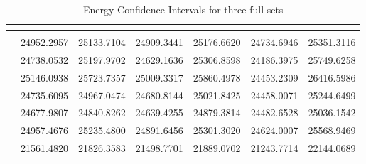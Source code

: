 \begin{table}[h!]
    \begin{center}
        \begin{tabular}{|c|r|r|r|r|r|r|}
            \hline
            &  &  &  \\
            \hline
             &  &  &  &  &  &  \\
            \hline
             & 24952.2957 & 25133.7104 & 24909.3441 & 25176.6620 & 24734.6946 & 25351.3116 \\
            \hline
             & 24738.0532 & 25197.9702 & 24629.1636 & 25306.8598 & 24186.3975 & 25749.6258 \\
            \hline
             & 25146.0938 & 25723.7357 & 25009.3317 & 25860.4978 & 24453.2309 & 26416.5986 \\
            \hline
             & 24735.6095 & 24967.0474 & 24680.8144 & 25021.8425 & 24458.0071 & 25244.6499 \\
            \hline
             & 24677.9807 & 24840.8262 & 24639.4255 & 24879.3814 & 24482.6528 & 25036.1542 \\
            \hline
             & 24957.4676 & 25235.4800 & 24891.6456 & 25301.3020 & 24624.0007 & 25568.9469 \\
            \hline
             & 21561.4820 & 21826.3583 & 21498.7701 & 21889.0702 & 21243.7714 & 22144.0689 \\
            \hline
        \end{tabular}
        \caption{Energy Confidence Intervals for three full sets}
        \label{table:ci:energy:runs}
    \end{center}
\end{table}
